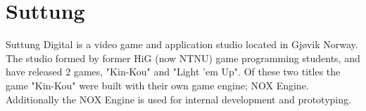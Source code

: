 \section{Suttung}
Suttung Digital is a video game and application studio located in Gjøvik Norway.
The studio formed by former HiG (now NTNU) game programming students,
and have released 2 games, "Kin-Kou" and "Light 'em Up".
Of these two titles the game "Kin-Kou" were built with their own game engine; NOX Engine.
Additionally the NOX Engine is used for internal development and prototyping.
